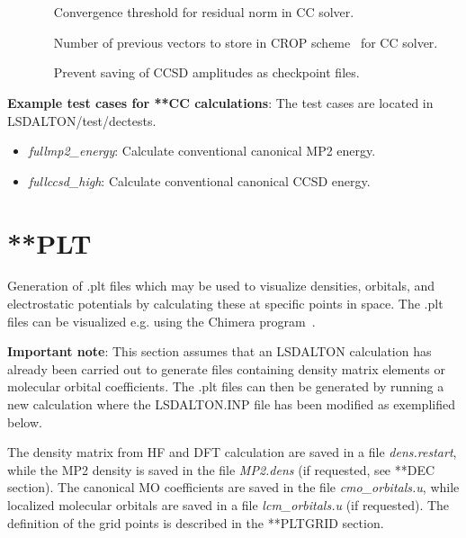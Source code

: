 \begin{description}
\item[]  \verb| | \newline
Convergence threshold for residual norm in CC solver.


\item[]  \verb| | \newline
Number of previous vectors to store in CROP scheme~\cite{crop} for CC solver.

\item[]  \verb| | \newline
Prevent saving of CCSD amplitudes as checkpoint files. 


\end{description}


\vspace{1 cm}
\noindent
\textbf{Example test cases for **CC calculations}: \newline
The test cases are located in LSDALTON/test/dectests.

\begin{itemize}
\item
\textit{fullmp2\_energy}: Calculate conventional canonical MP2 energy.
\item
\textit{fullccsd\_high}: Calculate conventional canonical CCSD energy.
\end{itemize}





\section{**PLT}\label{sec:plt}
Generation of .plt files which may be used to visualize densities, orbitals, and electrostatic potentials by calculating these at specific points in space.
The .plt files can be visualized e.g. using the Chimera program~\cite{chimera}.

\textbf{Important note}: This section assumes that an LSDALTON calculation has already been carried out to generate files containing
density matrix elements or molecular orbital coefficients. The .plt files can then be generated by running a new calculation where the LSDALTON.INP file has been modified as exemplified below.

The density matrix from HF and DFT calculation are saved in a file \emph{dens.restart}, while the MP2 density is saved in the file \emph{MP2.dens} (if requested, see **DEC section).
The canonical MO coefficients are saved in the file \emph{cmo\_orbitals.u}, while localized molecular orbitals are saved in a file \emph{lcm\_orbitals.u} (if requested).
The definition of the grid points is described in the **PLTGRID section.

